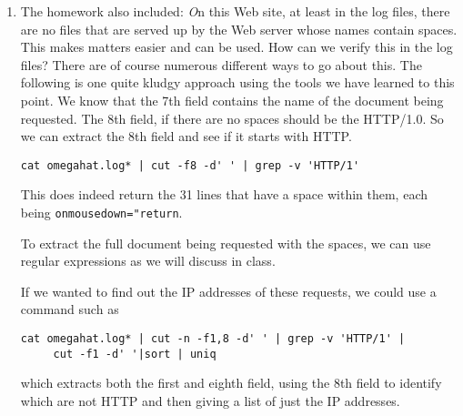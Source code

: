 \documentclass[10pt]{article}
\def\executable#1{\textbf{#1}}
\begin{document}
\begin{enumerate}
Now, we have to loop over the the resulting IP addresses and
get all the documents each requested.
To do this, we can store the output from the command to get IP
addresses either in a file or in a variable.
We'll do the latter so we don't have to clean up after them.
\begin{verbatim}
IP=`cat omegahat.log* | cut -f 1 -d ' ' 
         | sort | uniq -c | sort -rg |  head -n $n | sed -e 's/.* //'`
\end{verbatim}
Here we just execute the command and replace it with its output via
the `` and assign this to the variable named $IP$.

Next, we can use the separate words (IP addresses) in our loop.
\begin{verbatim}
for ip in $IP ; do 

done
\end{verbatim}
And all we have to do is figure out what to do in the loop.
We want to use \executable{grep}  to find all
requests for that IP address in \verb+$ip+ and store
the 7th field in the file named \verb+$ip+.
\begin{verbatim}
for ip in $IP ; do 
  grep $ip | cut -f7 -d' ' > $ip
done
\end{verbatim}

\item
The homework also included:
{\textit
On this Web site, at least in the log files, there are no files  
that are served up by the Web server
whose names contain spaces. 
This makes matters easier and can be used.
How can we verify this in the log files?
}
There are of course numerous different ways to go about this.
The following is one quite kludgy approach using the tools
we have learned to this point.
We know that the 7th field contains the name of the document
being requested. The 8th field, if there are no spaces
should be the HTTP/1.0.
So we can extract the 8th field and see if it starts
with HTTP.
\begin{verbatim}
cat omegahat.log* | cut -f8 -d' ' | grep -v 'HTTP/1'
\end{verbatim}
This does indeed return the 31 lines that have a space within them,
each being 
\verb+onmousedown="return+.

To extract the full document being requested with the spaces,
we can use regular expressions as we will discuss in class.

If we wanted to find out the IP addresses of these requests, we could
use a command such as
\begin{verbatim}
cat omegahat.log* | cut -n -f1,8 -d' ' | grep -v 'HTTP/1' | 
     cut -f1 -d' '|sort | uniq
\end{verbatim}
which extracts both the first and eighth field, using the 8th field to
identify  which are not HTTP and then giving a list of just the IP addresses.



\end{enumerate}
\end{document}
